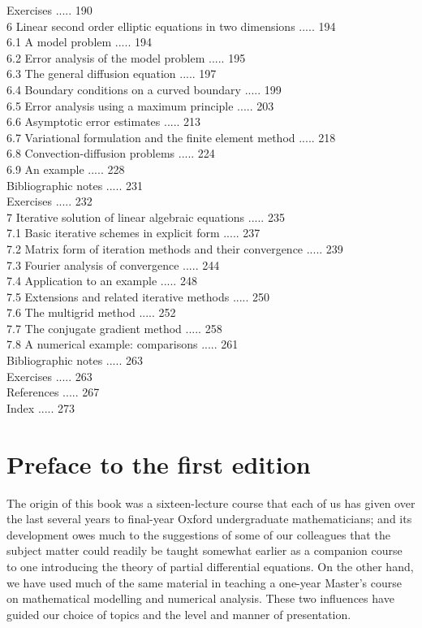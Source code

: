 \documentclass[10pt]{article}
\begin{document}
Exercises ..... 190\\
6 Linear second order elliptic equations in two dimensions ..... 194\\
6.1 A model problem ..... 194\\
6.2 Error analysis of the model problem ..... 195\\
6.3 The general diffusion equation ..... 197\\
6.4 Boundary conditions on a curved boundary ..... 199\\
6.5 Error analysis using a maximum principle ..... 203\\
6.6 Asymptotic error estimates ..... 213\\
6.7 Variational formulation and the finite element method ..... 218\\
6.8 Convection-diffusion problems ..... 224\\
6.9 An example ..... 228\\
Bibliographic notes ..... 231\\
Exercises ..... 232\\
7 Iterative solution of linear algebraic equations ..... 235\\
7.1 Basic iterative schemes in explicit form ..... 237\\
7.2 Matrix form of iteration methods and their convergence ..... 239\\
7.3 Fourier analysis of convergence ..... 244\\
7.4 Application to an example ..... 248\\
7.5 Extensions and related iterative methods ..... 250\\
7.6 The multigrid method ..... 252\\
7.7 The conjugate gradient method ..... 258\\
7.8 A numerical example: comparisons ..... 261\\
Bibliographic notes ..... 263\\
Exercises ..... 263\\
References ..... 267\\
Index ..... 273

\section*{Preface to the first edition}
The origin of this book was a sixteen-lecture course that each of us has given over the last several years to final-year Oxford undergraduate mathematicians; and its development owes much to the suggestions of some of our colleagues that the subject matter could readily be taught somewhat earlier as a companion course to one introducing the theory of partial differential equations. On the other hand, we have used much of the same material in teaching a one-year Master's course on mathematical modelling and numerical analysis. These two influences have guided our choice of topics and the level and manner of presentation.
\end{document}

